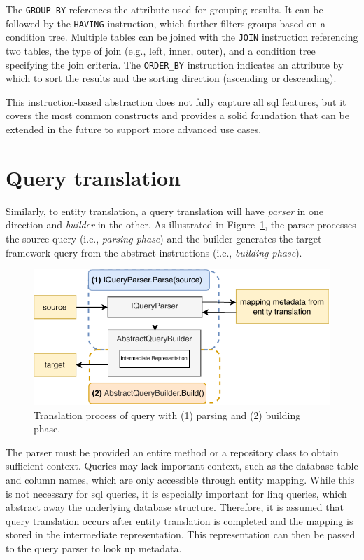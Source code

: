 The \texttt{GROUP\_BY} references the attribute used for grouping results. It can be followed by the \texttt{HAVING} instruction, which further filters groups based on a condition tree. 
Multiple tables can be joined with the \texttt{JOIN} instruction referencing two tables, the type of join (e.g., left, inner, outer), and a condition tree specifying the join criteria. 
The \texttt{ORDER\_BY} instruction indicates an attribute by which to sort the results and the sorting direction (ascending or descending).

This instruction-based abstraction does not fully capture all \acrshort{sql} features, but it covers the most common constructs and provides a solid foundation that can be extended in the future to support more advanced use cases.

\section{Query translation}
Similarly, to entity translation, a query translation will have \textit{parser} in one direction and \textit{builder} in the other. As illustrated in Figure~\ref{fig:translation_process_query}, the parser processes the source query (i.e., \textit{parsing phase}) and the builder generates the target framework query from the abstract instructions (i.e., \textit{building phase}).

\begin{figure}[h]
  \centering
  \includegraphics[scale=1]{thesis/img/thesis/04_translate_process_queries.drawio.pdf}
  \caption{Translation process of query with (1) parsing and (2) building phase.}
  \label{fig:translation_process_query}
\end{figure}

The parser must be provided an entire method or a repository class to obtain sufficient context. Queries may lack important context, such as the database table and column names, which are only accessible through entity mapping. While this is not necessary for \acrshort{sql} queries, it is especially important for \acrshort{linq} queries, which abstract away the underlying database structure. Therefore, it is assumed that query translation occurs after entity translation is completed and the mapping is stored in the intermediate representation. This representation can then be passed to the query parser to look up metadata.

